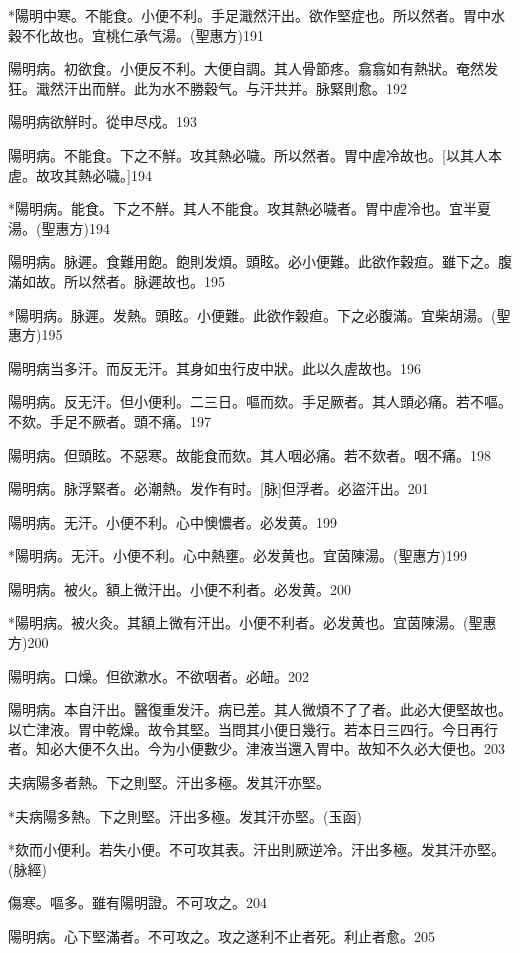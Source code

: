 \documentclass[12pt,twoside,UTF8,b5paper]{ctexbook}
\begin{document}
*陽明中寒。不能食。小便不利。手足濈然汗出。欲作堅症也。所以然者。胃中水穀不化故也。宜桃仁承气湯。(聖惠方)191

陽明病。初欲食。小便反不利。大便自調。其人骨節疼。翕翕如有熱狀。奄然发狂。濈然汗出而觧。此为水不勝穀气。与汗共并。脉緊則愈。192

陽明病欲觧时。從申尽戍。193

陽明病。不能食。下之不觧。攻其熱必噦。所以然者。胃中虗冷故也。[以其人本虗。故攻其熱必噦。]194

*陽明病。能食。下之不觧。其人不能食。攻其熱必噦者。胃中虗冷也。宜半夏湯。(聖惠方)194

陽明病。脉遲。食難用飽。飽則发煩。頭眩。必小便難。此欲作穀疸。雖下之。腹滿如故。所以然者。脉遲故也。195

*陽明病。脉遲。发熱。頭眩。小便難。此欲作榖疸。下之必腹滿。宜柴胡湯。(聖惠方)195

陽明病当多汗。而反无汗。其身如虫行皮中狀。此以久虗故也。196

陽明病。反无汗。但小便利。二三日。嘔而欬。手足厥者。其人頭必痛。若不嘔。不欬。手足不厥者。頭不痛。197

陽明病。但頭眩。不惡寒。故能食而欬。其人咽必痛。若不欬者。咽不痛。198

陽明病。脉浮緊者。必潮熱。发作有时。[脉]但浮者。必盜汗出。201

陽明病。无汗。小便不利。心中懊憹者。必发黄。199

*陽明病。无汗。小便不利。心中熱壅。必发黄也。宜茵陳湯。(聖惠方)199

陽明病。被火。額上微汗出。小便不利者。必发黄。200

*陽明病。被火灸。其額上微有汗出。小便不利者。必发黄也。宜茵陳湯。(聖惠方)200

陽明病。口燥。但欲漱水。不欲咽者。必衄。202

陽明病。本自汗出。醫復重发汗。病已差。其人微煩不了了者。此必大便堅故也。以亡津液。胃中乾燥。故令其堅。当問其小便日幾行。若本日三四行。今日再行者。知必大便不久出。今为小便數少。津液当還入胃中。故知不久必大便也。203

夫病陽多者熱。下之則堅。汗出多極。发其汗亦堅。

*夫病陽多熱。下之則堅。汗出多極。发其汗亦堅。(玉函)

*欬而小便利。若失小便。不可攻其表。汗出則厥逆冷。汗出多極。发其汗亦堅。(脉經)

傷寒。嘔多。雖有陽明證。不可攻之。204

陽明病。心下堅滿者。不可攻之。攻之遂利不止者死。利止者愈。205
\end{document}

